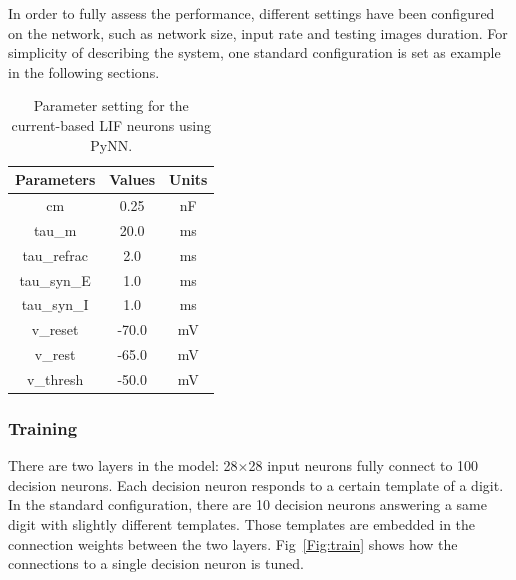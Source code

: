 In order to fully assess the performance, different settings have been configured on the network, such as network size, input rate and testing images duration.
For simplicity of describing the system, one standard configuration is set as example in the following sections.
\begin{table}[hbbp]
\centering
\caption{\label{tbl:pynnSetting}Parameter setting for the current-based LIF neurons using PyNN.}
\bgroup
\def\arraystretch{1.1}
  \begin{tabular}{c|c|c}
  Parameters & Values & Units \\
  \hline
  cm & 0.25 & nF	\\
  tau\_m & 20.0 & ms\\
  tau\_refrac & 2.0 & ms\\
  tau\_syn\_E & 1.0 & ms\\
  tau\_syn\_I & 1.0 & ms\\
  v\_reset & -70.0 & mV\\
  v\_rest & -65.0 & mV\\
  v\_thresh & -50.0 & mV\\
  \end{tabular}
\egroup
\end{table}

\subsubsection{Training}

There are two layers in the model: 28$\times$28 input neurons fully connect to 100 decision neurons.
Each decision neuron responds to a certain template of a digit.
In the standard configuration, there are 10 decision neurons answering a same digit with slightly different templates.
Those templates are embedded in the connection weights between the two layers.
Fig~\ref{Fig:train} shows how the connections to a single decision neuron is tuned.

